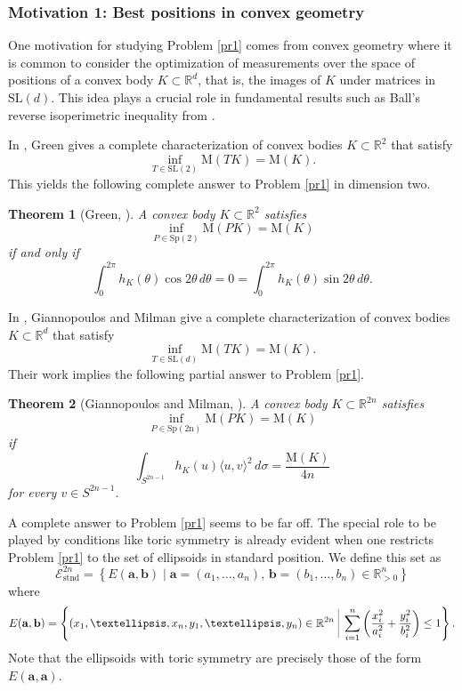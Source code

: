 \documentclass[12pt]{amsart}
\newtheorem{theorem}{Theorem}[section]
\theoremstyle{definition}
\def\bigmid{\ \rule[-3.5mm]{0.1mm}{9mm}\ }
\newcommand{\RR}{{\mathbb R}}
\newcommand{\mw}{{{\mathrm {M}}}}
\begin{document}
\subsubsection{Motivation 1: Best positions in convex geometry} One motivation for studying Problem \ref{pr1} comes from convex geometry where it is common to consider the optimization of measurements over the space of positions of a convex body $K \subset \RR^{d}$, that is, the images of $K$ under matrices in $\mathrm{SL}(d)$. This idea plays a crucial role in fundamental results such as Ball's reverse isoperimetric inequality from \cite{ball}.

In \cite{gr}, Green gives a complete characterization of convex bodies $K \subset \RR^2$ that satisfy $$\inf_{T \in \mathrm{SL}(2)} \mw (TK)  = \mw (K).$$ This yields the following complete answer to Problem \ref{pr1} in dimension two.

\begin{theorem}[Green, \cite{gr}]\label{green}
A convex body $K \subset \RR^2$ satisfies $$\inf_{P \in \mathrm{\mathrm{Sp}(2)}} \mw (PK)  = \mw (K)$$
if and only if $$\int_0^{2\pi} h_{K}(\theta)\cos 2 \theta \, d \theta =0=\int_0^{2\pi} h_{K}(\theta)\sin  2 \theta \, d \theta.$$
\end{theorem}

In \cite{gm}, Giannopoulos and Milman give a complete characterization of convex bodies $K \subset \RR^d$ that satisfy $$\inf_{T \in \mathrm{SL}(d)} \mw (TK)  = \mw (K).$$ Their work implies the following partial answer to Problem \ref{pr1}.
\begin{theorem}[Giannopoulos and Milman, \cite{gm}]\label{gm}
A convex body $K \subset \RR^{2n}$ satisfies $$\inf_{P \in \mathrm{\mathrm{Sp}(2n)}} \mw (PK)  = \mw (K)$$
if $$\int_{S^{2n-1}} h_{K}(u) \langle u,v\rangle^2 \, d \sigma = \frac{\mw (K)}{4n}$$
for every $v \in S^{2n-1}.$
\end{theorem}

A complete answer to Problem \ref{pr1} seems to be far off. The special role to be played by conditions like toric symmetry is already evident when one restricts Problem \ref{pr1} to the set of ellipsoids in standard position. We define this set as 
$$\mathcal{E}_{\mathrm{stnd}}^{2n} =\left\{E(\mathbf{a},\mathbf{b}) \mid \mathbf{a}=(a_1, \dots, a_n),\, \mathbf{b}=(b_1, \dots, b_n) \in\RR^n_{>0} \right\}$$ where 
\begin{align*}
    E(\mathbf{a},\mathbf{b})= \left\{ (x_1, \dots, x_n, y_1, \dots, y_n) \in \mathbb{R}^{2n} \bigmid  \sum_{i=1}^n \left(\frac{x_i^2}{a^2_i} +\frac{y_i^2}{b^2_i}\right)\leq 1\right\}.
\end{align*}
Note that the ellipsoids with toric symmetry are precisely those of the form  $E(\mathbf{a}, \mathbf{a})$. 
\end{document}
